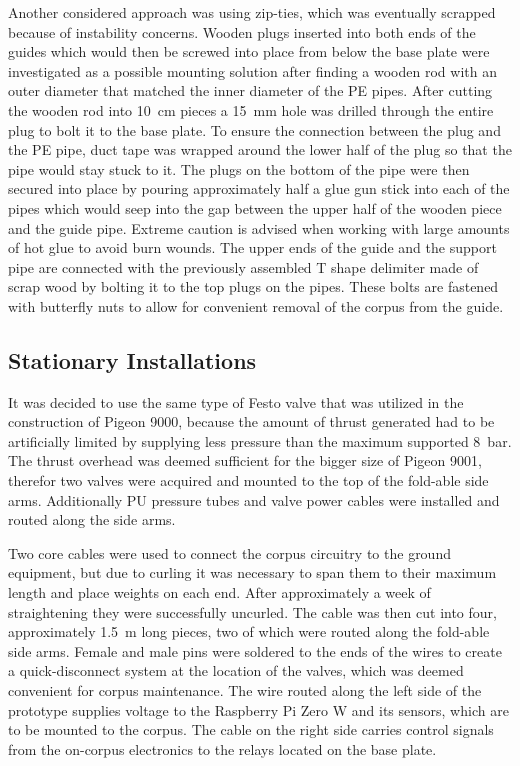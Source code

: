 Another considered approach was using zip-ties, which was eventually scrapped because of instability concerns. 
Wooden plugs inserted into both ends of the guides which would then be screwed into place from below the base plate were investigated as a possible mounting solution after finding a wooden rod with an outer diameter that matched the inner diameter of the PE pipes. After cutting the wooden rod into \SI{10}{\centi\meter} pieces a \SI{15}{\milli\meter} hole was drilled through the entire plug to bolt it to the base plate. To ensure the connection between the plug and the PE pipe, duct tape was wrapped around the lower half of the plug so that the pipe would stay stuck to it. The plugs on the bottom of the pipe were then secured into place by pouring approximately half a glue gun stick into each of the pipes which would seep into the gap between the upper half of the wooden piece and the guide pipe. Extreme caution is advised when working with large amounts of hot glue to avoid burn wounds. The upper ends of the guide and the support pipe are connected with the previously assembled T shape delimiter made of scrap wood by bolting it to the top plugs on the pipes. These bolts are fastened with butterfly nuts to allow for convenient removal of the corpus from the guide. 

\subsection{Stationary Installations}
It was decided to use the same type of Festo valve that was utilized in the construction of Pigeon 9000, because the amount of thrust generated had to be artificially limited by supplying less pressure than the maximum supported \SI{8}{\bar}. The thrust overhead was deemed sufficient for the bigger size of Pigeon 9001, therefor two valves were acquired and mounted to the top of the fold-able side arms. Additionally PU pressure tubes and valve power cables were installed and routed along the side arms.

Two core cables were used to connect the corpus circuitry to the ground equipment, but due to curling it was necessary to span them to their maximum length and place weights on each end. After approximately a week of straightening they were successfully uncurled. The cable was then cut into four, approximately \SI{1.5}{\meter} long pieces, two of which were routed along the fold-able side arms. Female and male pins were soldered to the ends of the wires to create a quick-disconnect system at the location of the valves, which was deemed convenient for corpus maintenance. The wire routed along the left side of the prototype supplies voltage to the Raspberry Pi Zero W and its sensors, which are to be mounted to the corpus. The cable on the right side carries control signals from the on-corpus electronics to the relays located on the base plate. 


